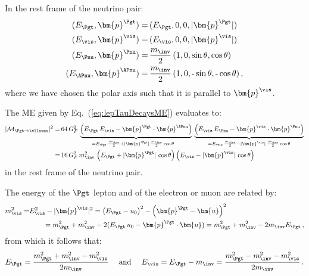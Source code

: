 In the rest frame of the neutrino pair:
\begin{align}
( E_{\Pgt}, \bm{p}^{\Pgt} ) = & \, ( E_{\Pgt}, 0, 0, \vert\bm{p}^{\Pgt}\vert ) \nonumber \\
( E_{\vis}, \bm{p}^{\vis} ) = & \, ( E_{\vis}, 0, 0, \vert\bm{p}^{\vis}\vert ) \nonumber \\
( E_{\Pnu}, \bm{p}^{\Pnu} ) = & \, \frac{m_{\inv}}{2} \, ( 1, 0, \sin\theta, \cos\theta ) \nonumber \\
( E_{\APnu}, \bm{p}^{\APnu} ) = & \, \frac{m_{\inv}}{2} \, ( 1, 0, \mbox{-}\sin\theta, \mbox{-}\cos\theta ) \, , \nonumber 
\end{align}
where we have chosen the polar axis such that it is parallel to $\bm{p}^{\vis}$.

The ME given by Eq.~(\ref{eq:lepTauDecaysME}) evaluates to:
\begin{align}
\vert\mathcal{M}_{\Pgt \to \ellnunu}\vert^{2} 
 = & \, 64 \, G^{2}_{F} \, 
  \underbrace{\left( E_{\Pgt} \, E_{\vis} - \bm{p}^{\Pgt} \cdot \bm{p}^{\APnu} \right)}_{= E_{\Pgt} \, \frac{m_{\inv}}{2} + \vert\bm{p}^{\Pgt}\vert \, \frac{m_{\inv}}{2} \cos\theta \quad} \,
  \underbrace{\left( E_{\vis} \, E_{\Pnu} - \bm{p}^{\vis} \cdot \bm{p}^{\Pnu} \right)}_{= E_{\vis} \, \frac{m_{\inv}}{2} - \vert\bm{p}^{\vis}\vert \, \frac{m_{\inv}}{2} \cos\theta} \nonumber \\
 = & \, 16 \, G^{2}_{F} \, m^{2}_{\inv} \, \left( E_{\Pgt} + \vert\bm{p}^{\Pgt}\vert \, \cos\theta \right)  \left( E_{\vis} - \vert\bm{p}^{\vis}\vert \, \cos\theta \right) 
\label{eq:lepTauDecaysMErf}
\end{align}
in the rest frame of the neutrino pair.

The energy of the $\Pgt$ lepton and of the electron or muon are
related by:
\begin{align}
m^{2}_{\vis} = & E_{\vis}^{2} - \vert\bm{p}^{\vis}\vert^{2} 
 = \left( E_{\Pgt} - u_{0} \right)^{2} - \left( \bm{p}^{\Pgt} - \bm{u} \right)^{2} \nonumber \\
& \qquad
 = m^{2}_{\Pgt} + m^{2}_{\inv} - 2 (E_{\Pgt} \, u_{0} - \bm{p}^{\Pgt} \cdot \bm{u}) 
 = m^{2}_{\Pgt} + m^{2}_{\inv} - 2 m_{\inv} E_{\Pgt} \, ,
\end{align}
from which it follows that:
\begin{equation}
E_{\Pgt} = \frac{m^{2}_{\Pgt} + m^{2}_{\inv} - m^{2}_{\vis}}{2
  m_{\inv}} \quad \mbox{ and } \quad E_{\vis} = E_{\Pgt} - m_{\inv} =
\frac{m^{2}_{\Pgt} - m^{2}_{\inv} - m^{2}_{\vis}}{2 m_{\inv}} \, .
\label{eq:lepTauDecaysEn}
\end{equation}

